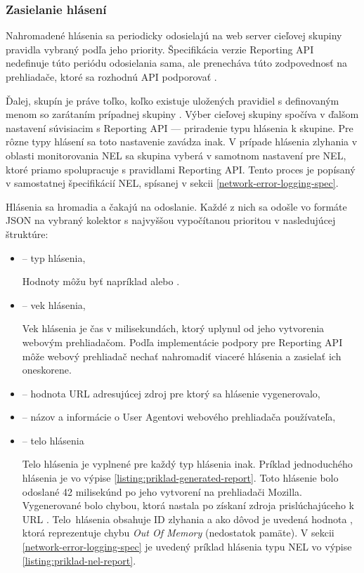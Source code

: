 \subsubsection{Zasielanie hlásení}

Nahromadené hlásenia sa periodicky odosielajú na web server cieľovej skupiny  pravidla vybraný podľa jeho priority.
Špecifikácia verzie  Reporting API nedefinuje túto periódu odosielania sama, ale prenecháva túto zodpovednosť na prehliadače, ktoré sa rozhodnú API podporovať \cite{W3C-reporting-api}.

Ďalej, skupín  je práve toľko, koľko existuje uložených pravidiel s definovaným menom so zarátaním prípadnej skupiny .
Výber cieľovej skupiny spočíva v ďalšom nastavení súvisiacim s Reporting API --- priradenie typu hlásenia k skupine.
Pre rôzne typy hlásení sa toto nastavenie zavádza inak.
V prípade hlásenia zlyhania v oblasti monitorovania NEL sa skupina  vyberá v samotnom nastavení pre NEL, ktoré priamo spolupracuje s pravidlami Reporting API.
Tento proces je popísaný v samostatnej špecifikácií NEL, spísanej v sekcii \ref{network-error-logging-spec}.

Hlásenia sa hromadia a čakajú na odoslanie.
Každé z nich sa odošle vo formáte JSON na vybraný kolektor s najvyššou vypočítanou prioritou v nasledujúcej štruktúre:
\begin{itemize}
    \item {} -- typ hlásenia,

    Hodnoty môžu byť napríklad  alebo .
    
    \item {} -- vek hlásenia,

    Vek hlásenia je čas v milisekundách, ktorý uplynul od jeho vytvorenia webovým prehliadačom.
    Podľa implementácie podpory pre Reporting API môže webový prehliadač nechať nahromadiť viaceré hlásenia a zasielať ich oneskorene.
    
    \item {} -- hodnota URL adresujúcej zdroj pre ktorý sa hlásenie vygenerovalo,
    
    \item {} -- názov a informácie o User Agentovi webového prehliadača používateľa,
    
    \item {} -- telo hlásenia

    Telo hlásenia je vyplnené pre každý typ hlásenia inak. 
    Príklad jednoduchého hlásenia je vo výpise \ref{listing:priklad-generated-report}.
    Toto hlásenie bolo odoslané 42 milisekúnd po jeho vytvorení na prehliadači Mozilla. Vygenerované bolo chybou, ktorá nastala po získaní zdroja prislúchajúceho k URL . \mbox{Telo hlásenia} obsahuje ID zlyhania a ako dôvod je uvedená hodnota , ktorá reprezentuje chybu \textit{Out Of Memory} (nedostatok pamäte).
    V sekcii \ref{network-error-logging-spec} je uvedený príklad hlásenia typu NEL vo výpise \ref{listing:priklad-nel-report}.
\end{itemize}


